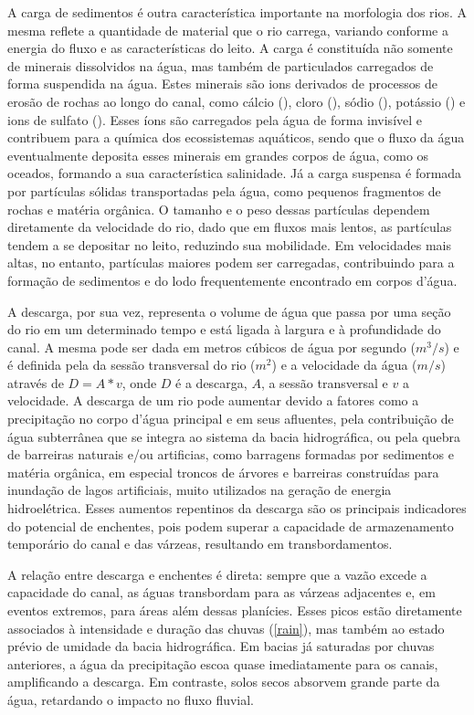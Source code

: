 A carga de sedimentos é outra característica importante na morfologia dos rios. A mesma reflete a quantidade de material
que o rio carrega, variando conforme a energia do fluxo e as características do leito. A carga é constituída não somente
de minerais dissolvidos na água, mas também de particulados carregados de forma suspendida na água. Estes minerais são
ions derivados de processos de erosão de rochas ao longo do canal, como cálcio (), cloro (), sódio
(), potássio () e ions de sulfato (). Esses íons são carregados pela água de forma invisível
e contribuem para a química dos ecossistemas aquáticos, sendo que o fluxo da água eventualmente deposita esses minerais
em grandes corpos de água, como os oceados, formando a sua característica salinidade. Já a carga suspensa é formada por
partículas sólidas transportadas pela água, como pequenos fragmentos de rochas e matéria orgânica. O tamanho e o peso
dessas partículas dependem diretamente da velocidade do rio, dado que em fluxos mais lentos, as partículas tendem a se
depositar no leito, reduzindo sua mobilidade. Em velocidades mais altas, no entanto, partículas maiores podem ser
carregadas, contribuindo para a formação de sedimentos e do lodo frequentemente encontrado em corpos d'água.

A descarga, por sua vez, representa o volume de água que passa por uma seção do rio em um determinado tempo e está
ligada à largura e à profundidade do canal. A mesma pode ser dada em metros cúbicos de água por segundo ($m^3/s$) e é
definida pela da sessão transversal do rio ($m^2$) e a velocidade da água ($m/s$) através de $D = A*v$, onde $D$ é a
descarga, $A$, a sessão transversal e $v$ a velocidade. A descarga de um rio pode aumentar devido a fatores como a
precipitação no corpo d'água principal e em seus afluentes, pela contribuição de água subterrânea que se integra ao
sistema da bacia hidrográfica, ou pela quebra de barreiras naturais e/ou artificias, como barragens formadas por
sedimentos e matéria orgânica, em especial troncos de árvores e barreiras construídas para inundação de lagos
artificiais, muito utilizados na geração de energia hidroelétrica. Esses aumentos repentinos da descarga são os
principais indicadores do potencial de enchentes, pois podem superar a capacidade de armazenamento temporário do canal e
das várzeas, resultando em transbordamentos.

A relação entre descarga e enchentes é direta: sempre que a vazão excede a capacidade do canal, as águas transbordam
para as várzeas adjacentes e, em eventos extremos, para áreas além dessas planícies. Esses picos estão diretamente
associados à intensidade e duração das chuvas (\autoref{rain}), mas também ao estado prévio de umidade da bacia
hidrográfica. Em bacias já saturadas por chuvas anteriores, a água da precipitação escoa quase imediatamente para os
canais, amplificando a descarga. Em contraste, solos secos absorvem grande parte da água, retardando o impacto no fluxo
fluvial.

